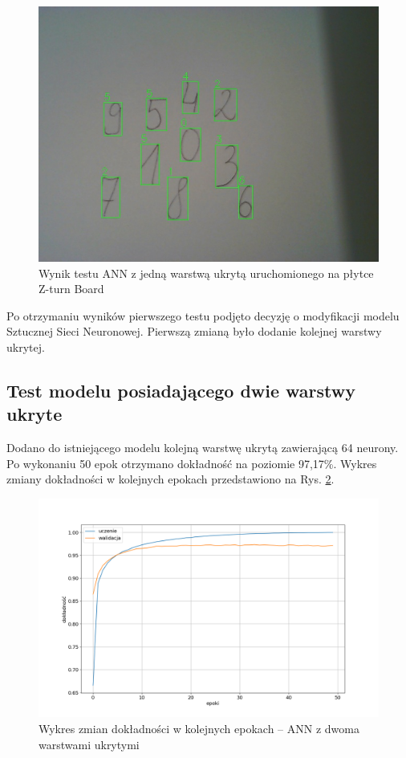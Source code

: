 \begin{figure}[!h]
    \centering
    \includegraphics[width=\textwidth]{img/1hid-layer-zturn-img.jpg}
    \caption{Wynik testu ANN z jedną warstwą ukrytą uruchomionego na płytce Z-turn Board}
    \label{1hid-layer-zturn-img}
\end{figure}

Po otrzymaniu wyników pierwszego testu podjęto decyzję o modyfikacji modelu Sztucznej Sieci Neuronowej. Pierwszą zmianą było dodanie kolejnej warstwy ukrytej.

\subsection{Test modelu posiadającego dwie warstwy ukryte}

Dodano do istniejącego modelu kolejną warstwę ukrytą zawierającą 64 neurony. Po wykonaniu 50 epok otrzymano dokładność na poziomie 97,17\%. Wykres zmiany dokładności w kolejnych epokach przedstawiono na Rys. \ref{keras-accuracy2}.

\begin{figure}
    \centering
    \includegraphics[width=\textwidth]{img/keras-accuracy2.png}
    \caption{Wykres zmian dokładności w kolejnych epokach -- ANN z dwoma warstwami ukrytymi}
    \label{keras-accuracy2}
  \end{figure}


